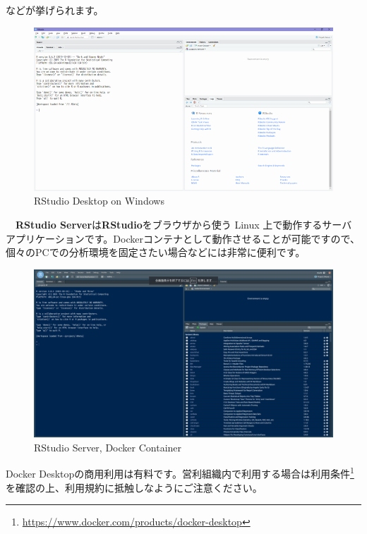 \documentclass[
  12pt,
]{book}
\DeclareRobustCommand{\href}[2]{#2\footnote{\url{#1}}}
\begin{document}
などが挙げられます。

\begin{figure}[H]

{\centering \includegraphics[width=0.9\linewidth,]{./fig/RStudio/DT} 

}

\caption{RStudio Desktop on Windows}\label{fig:unnamed-chunk-16}
\end{figure}

　\textbf{RStudio Server}は\textbf{RStudio}をブラウザから使う Linux 上で動作するサーバアプリケーションです。Dockerコンテナとして動作させることが可能ですので、個々のPCでの分析環境を固定さたい場合などには非常に便利です。

\begin{figure}[H]

{\centering \includegraphics[width=0.9\linewidth,]{./fig/RStudio/RStudioServer} 

}

\caption{RStudio Server, Docker Container}\label{fig:unnamed-chunk-17}
\end{figure}

\begin{hint-box}
Docker Desktopの商用利用は有料です。営利組織内で利用する場合は\href{https://www.docker.com/products/docker-desktop}{利用条件}を確認の上、利用規約に抵触しなようにご注意ください。
\end{hint-box}
\end{document}
